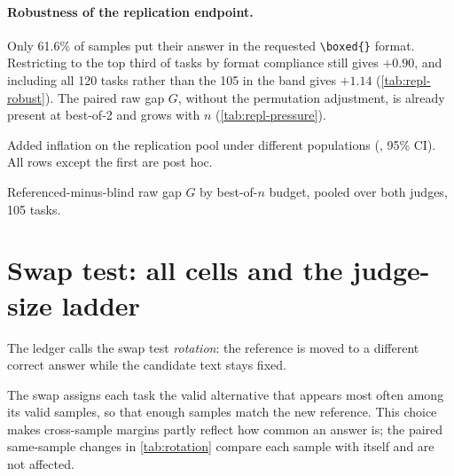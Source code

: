 \paragraph{Robustness of the replication endpoint.}
Only 61.6\% of samples put their answer in the requested \texttt{\textbackslash boxed\{\}} format. Restricting to the top third of tasks by format compliance still gives $+0.90$, and including all 120 tasks rather than the 105 in the band gives $+1.14$ (\cref{tab:repl-robust}). The paired raw gap $G$, without the permutation adjustment, is already present at best-of-2 and grows with $n$ (\cref{tab:repl-pressure}).

\begin{table}[htbp]
\centering
\caption{Added inflation on the replication pool under different populations (\sd, 95\% CI). All rows except the first are post hoc.}
\label{tab:repl-robust}
\footnotesize
\begin{adjustbox}{max width=\linewidth}\end{adjustbox}

\end{table}

\begin{table}[htbp]
\centering
\caption{Referenced-minus-blind raw gap $G$ by best-of-$n$ budget, pooled over both judges, 105 tasks.\ph}
\label{tab:repl-pressure}
\footnotesize
\begin{adjustbox}{max width=\linewidth}\end{adjustbox}

\end{table}

\FloatBarrier
\section{Swap test: all cells and the judge-size ladder}
\label{app:rotation}

The ledger calls the swap test \emph{rot\-ation}: the reference is moved to a different correct answer while the candidate text stays fixed.

The swap assigns each task the valid alternative that appears most often among its valid samples, so that enough samples match the new reference. This choice makes cross-sample margins partly reflect how common an answer is; the paired same-sample changes in \cref{tab:rotation} compare each sample with itself and are not affected.


